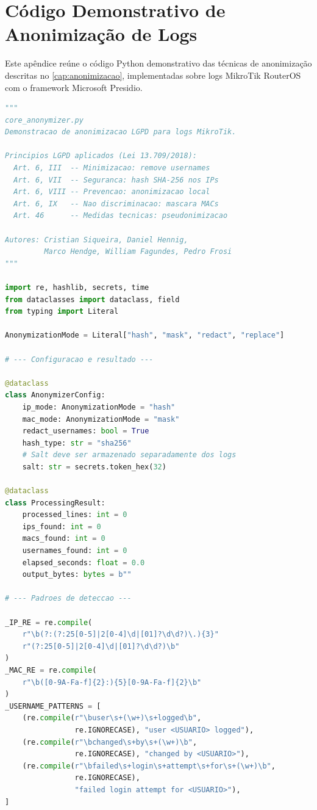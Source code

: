 
\chapter{Código Demonstrativo de Anonimização de Logs}
\label{apend:codigo}

Este apêndice reúne o código Python demonstrativo das técnicas de anonimização descritas no \autoref{cap:anonimizacao}, implementadas sobre logs MikroTik RouterOS com o framework Microsoft Presidio.

\begin{lstlisting}[language=Python,
    caption={Pipeline de anonimizacao de logs MikroTik -- core\_anonymizer.py},
    label={lst:core-completo}]
"""
core_anonymizer.py
Demonstracao de anonimizacao LGPD para logs MikroTik.

Principios LGPD aplicados (Lei 13.709/2018):
  Art. 6, III  -- Minimizacao: remove usernames
  Art. 6, VII  -- Seguranca: hash SHA-256 nos IPs
  Art. 6, VIII -- Prevencao: anonimizacao local
  Art. 6, IX   -- Nao discriminacao: mascara MACs
  Art. 46      -- Medidas tecnicas: pseudonimizacao

Autores: Cristian Siqueira, Daniel Hennig,
         Marco Hendge, William Fagundes, Pedro Frosi
"""

import re, hashlib, secrets, time
from dataclasses import dataclass, field
from typing import Literal

AnonymizationMode = Literal["hash", "mask", "redact", "replace"]

# --- Configuracao e resultado ---

@dataclass
class AnonymizerConfig:
    ip_mode: AnonymizationMode = "hash"
    mac_mode: AnonymizationMode = "mask"
    redact_usernames: bool = True
    hash_type: str = "sha256"
    # Salt deve ser armazenado separadamente dos logs
    salt: str = secrets.token_hex(32)

@dataclass
class ProcessingResult:
    processed_lines: int = 0
    ips_found: int = 0
    macs_found: int = 0
    usernames_found: int = 0
    elapsed_seconds: float = 0.0
    output_bytes: bytes = b""

# --- Padroes de deteccao ---

_IP_RE = re.compile(
    r"\b(?:(?:25[0-5]|2[0-4]\d|[01]?\d\d?)\.){3}"
    r"(?:25[0-5]|2[0-4]\d|[01]?\d\d?)\b"
)
_MAC_RE = re.compile(
    r"\b([0-9A-Fa-f]{2}:){5}[0-9A-Fa-f]{2}\b"
)
_USERNAME_PATTERNS = [
    (re.compile(r"\buser\s+(\w+)\s+logged\b",
                re.IGNORECASE), "user <USUARIO> logged"),
    (re.compile(r"\bchanged\s+by\s+(\w+)\b",
                re.IGNORECASE), "changed by <USUARIO>"),
    (re.compile(r"\bfailed\s+login\s+attempt\s+for\s+(\w+)\b",
                re.IGNORECASE),
                "failed login attempt for <USUARIO>"),
]


\end{lstlisting}
